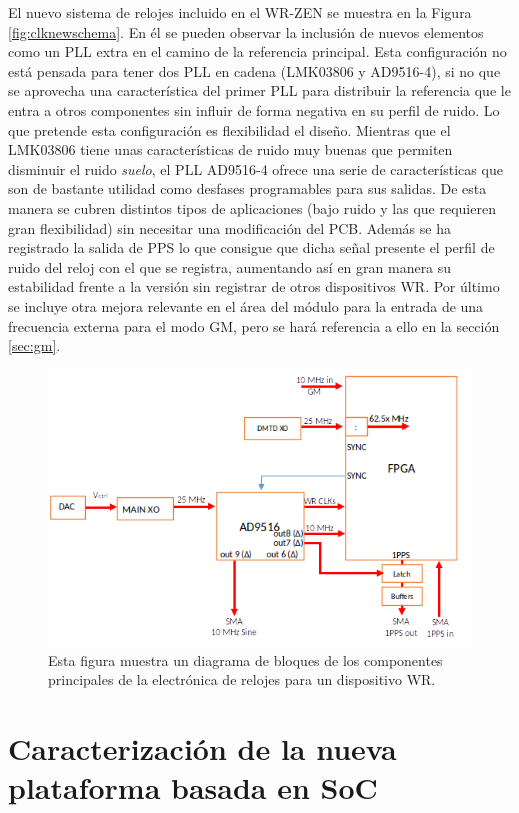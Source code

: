 El nuevo sistema de relojes incluido en el WR-ZEN se muestra en la Figura 
\ref{fig:clknewschema}. En él se pueden observar la inclusión de nuevos 
elementos como un PLL extra en el camino de la referencia principal. Esta 
configuración no está pensada para tener dos PLL en cadena (LMK03806 y 
AD9516-4), si no que se aprovecha una característica del primer PLL para 
distribuir la referencia que le entra a otros componentes sin influir de forma 
negativa en su perfil de ruido. Lo que pretende esta configuración es 
flexibilidad el diseño. Mientras que el LMK03806 tiene unas características de 
ruido muy buenas que permiten disminuir el ruido \textit{suelo}, el PLL 
AD9516-4 ofrece una serie de características que son de bastante utilidad como 
desfases programables para sus salidas. De esta manera se cubren distintos 
tipos de aplicaciones (bajo ruido y las que requieren gran flexibilidad) sin 
necesitar una modificación del PCB. Además se ha registrado la salida de PPS lo 
que consigue que dicha señal presente el perfil de ruido del reloj con el que 
se registra, aumentando así en gran manera su estabilidad frente a la versión 
sin registrar de otros dispositivos WR. Por último se incluye otra mejora 
relevante en el área del módulo para la entrada de una frecuencia externa para 
el modo GM, pero se hará referencia a ello en la sección \ref{sec:gm}.

\begin{figure}
	\centering
	\includegraphics[width=0.7\linewidth]{imagenes/wrclk}
	\caption[Esquema del sistema de reloj en WR]{Esta figura muestra un 
	diagrama de bloques de los componentes principales de la electrónica de 
	relojes para un dispositivo WR.}
	\label{fig:wrclk}
\end{figure}

\section{Caracterización de la nueva plataforma basada en SoC}

